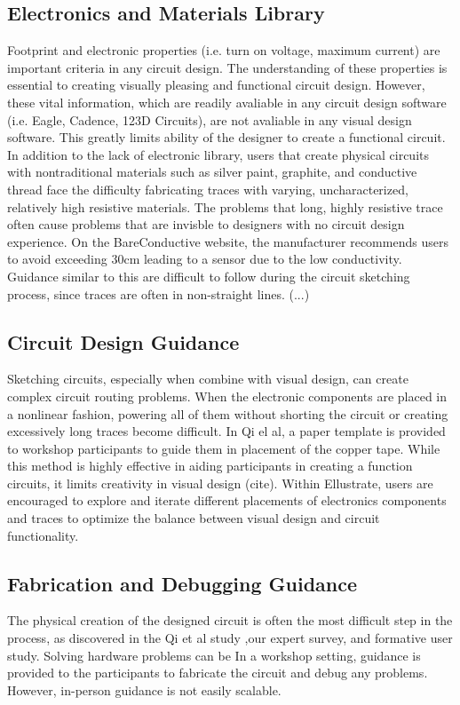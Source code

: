 \documentclass{sigchi}
\begin{document}
\subsection{Electronics and Materials Library}
Footprint and electronic properties (i.e. turn on voltage, maximum current) are important criteria in any circuit design. The understanding of these properties is essential to creating visually pleasing and functional circuit design. However, these vital information, which are readily avaliable in any circuit design software (i.e. Eagle, Cadence, 123D Circuits), are not avaliable in any visual design software. This greatly limits ability of the designer to create a functional circuit. In addition to the lack of electronic library, users that create physical circuits with nontraditional materials such as silver paint, graphite, and conductive thread face the difficulty fabricating traces with varying, uncharacterized, relatively high resistive materials. The problems that long, highly resistive trace often cause problems that are invisble to designers with no circuit design experience. On the BareConductive website, the manufacturer recommends users to avoid exceeding 30cm leading to a sensor due to the low conductivity. Guidance similar to this are difficult to follow during the circuit sketching process, since traces are often in non-straight lines. (...)

\subsection{Circuit Design Guidance}


Sketching circuits, especially when combine with visual design, can create complex circuit routing problems. When the electronic components are placed in a nonlinear fashion, powering all of them without shorting the circuit or creating excessively long traces become difficult. In Qi el al, a paper template is provided to workshop participants to guide them in placement of the copper tape. While this method is highly effective in aiding participants in creating a function circuits, it limits creativity in visual design (cite).  Within Ellustrate, users are encouraged to explore and iterate different placements of electronics components and traces to optimize the balance between visual design and circuit functionality. 

\subsection{Fabrication and Debugging Guidance}
The physical creation of the designed circuit is often the most difficult step in the process, as discovered in the Qi et al study ,our expert survey, and formative user study. Solving hardware problems can be In a workshop setting, guidance is provided to the participants to fabricate the circuit and debug any problems. However, in-person guidance is not easily scalable.
\end{document}

